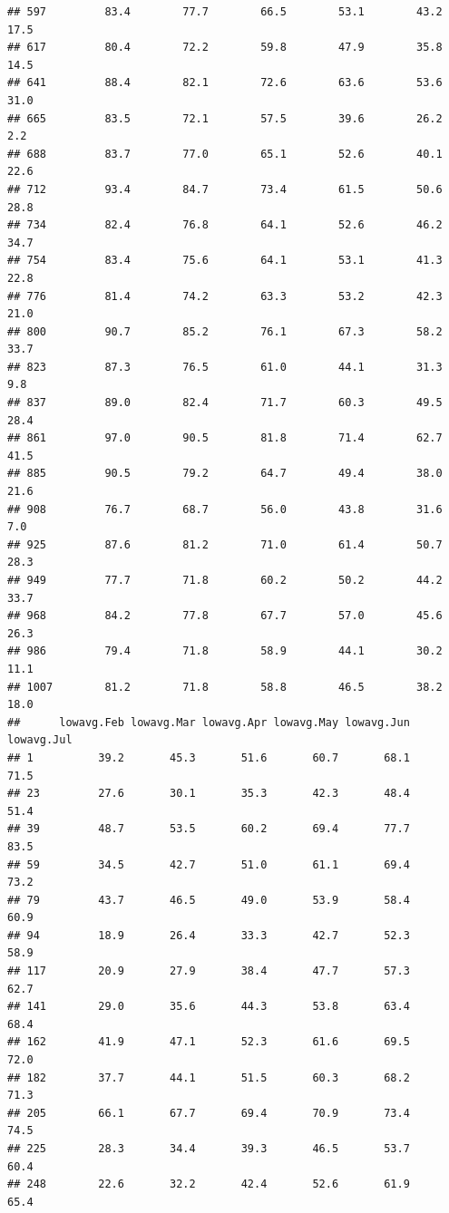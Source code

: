 \documentclass[
]{article}
\begin{document}
\begin{verbatim}
## 597         83.4        77.7        66.5        53.1        43.2       17.5
## 617         80.4        72.2        59.8        47.9        35.8       14.5
## 641         88.4        82.1        72.6        63.6        53.6       31.0
## 665         83.5        72.1        57.5        39.6        26.2        2.2
## 688         83.7        77.0        65.1        52.6        40.1       22.6
## 712         93.4        84.7        73.4        61.5        50.6       28.8
## 734         82.4        76.8        64.1        52.6        46.2       34.7
## 754         83.4        75.6        64.1        53.1        41.3       22.8
## 776         81.4        74.2        63.3        53.2        42.3       21.0
## 800         90.7        85.2        76.1        67.3        58.2       33.7
## 823         87.3        76.5        61.0        44.1        31.3        9.8
## 837         89.0        82.4        71.7        60.3        49.5       28.4
## 861         97.0        90.5        81.8        71.4        62.7       41.5
## 885         90.5        79.2        64.7        49.4        38.0       21.6
## 908         76.7        68.7        56.0        43.8        31.6        7.0
## 925         87.6        81.2        71.0        61.4        50.7       28.3
## 949         77.7        71.8        60.2        50.2        44.2       33.7
## 968         84.2        77.8        67.7        57.0        45.6       26.3
## 986         79.4        71.8        58.9        44.1        30.2       11.1
## 1007        81.2        71.8        58.8        46.5        38.2       18.0
##      lowavg.Feb lowavg.Mar lowavg.Apr lowavg.May lowavg.Jun lowavg.Jul
## 1          39.2       45.3       51.6       60.7       68.1       71.5
## 23         27.6       30.1       35.3       42.3       48.4       51.4
## 39         48.7       53.5       60.2       69.4       77.7       83.5
## 59         34.5       42.7       51.0       61.1       69.4       73.2
## 79         43.7       46.5       49.0       53.9       58.4       60.9
## 94         18.9       26.4       33.3       42.7       52.3       58.9
## 117        20.9       27.9       38.4       47.7       57.3       62.7
## 141        29.0       35.6       44.3       53.8       63.4       68.4
## 162        41.9       47.1       52.3       61.6       69.5       72.0
## 182        37.7       44.1       51.5       60.3       68.2       71.3
## 205        66.1       67.7       69.4       70.9       73.4       74.5
## 225        28.3       34.4       39.3       46.5       53.7       60.4
## 248        22.6       32.2       42.4       52.6       61.9       65.4

\end{verbatim}
\end{document}

